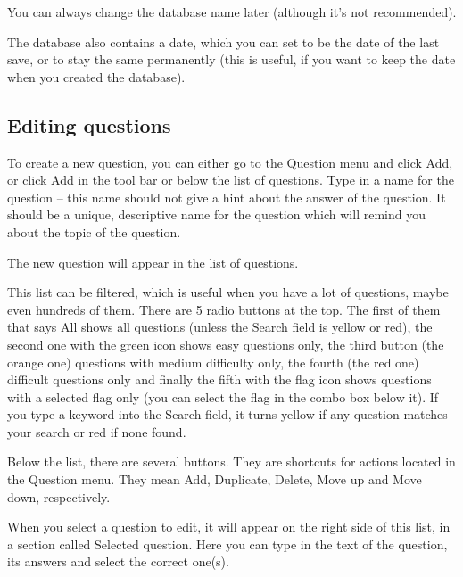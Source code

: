 You can always change the database name later (although it's not recommended).


The database also contains a date, which you can set to be the date of the last save, or to stay the same permanently (this is useful, if you want to keep the date when you created the database).


\subsection{Editing questions}

To create a new question, you can either go to the Question menu and click Add, or click Add in the tool bar or below the list of questions.
Type in a name for the question -- this name should not give a hint about the answer of the question.
It should be a unique, descriptive name for the question which will remind you about the topic of the question.

The new question will appear in the list of questions.


This list can be filtered, which is useful when you have a lot of questions, maybe even hundreds of them.
There are 5 radio buttons at the top.
The first of them that says All shows all questions (unless the Search field is yellow or red), the second one with the green icon shows easy questions only, the third button (the orange one) questions with medium difficulty only, the fourth (the red one) difficult questions only and finally the fifth with the flag icon shows questions with a selected flag only (you can select the flag in the combo box below it).
If you type a keyword into the Search field, it turns yellow if any question matches your search or red if none found.


Below the list, there are several buttons. They are shortcuts for actions located in the Question menu.
They mean Add, Duplicate, Delete, Move up and Move down, respectively.

When you select a question to edit, it will appear on the right side of this list, in a section called Selected question.
Here you can type in the text of the question, its answers and select the correct one(s).

